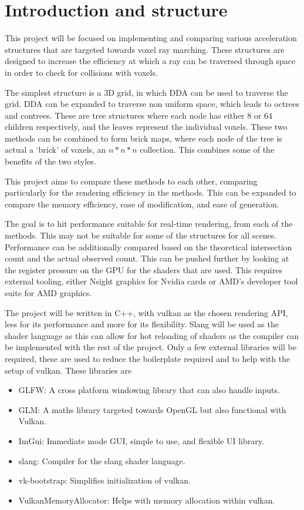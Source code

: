 \section*{Introduction and structure}

This project will be focused on implementing and comparing various
acceleration structures that are targeted towards voxel ray marching.
These structures are designed to increase the efficiency at which a
ray can be traversed through space in order to check for collisions with
voxels.

The simplest structure is a 3D grid, in which DDA can be used to
traverse the grid. DDA can be expanded to traverse non uniform space,
which leads to octrees and contrees. These are tree structures where
each node has either $8$ or $64$ children respectively, and the leaves
represent the individual voxels. These two methods can be combined to
form brick maps, where each node of the tree is actual a `brick' of voxels,
an $n*n*n$ collection. This combines some of the benefits of the two styles.

This project aims to compare these methods to each other, comparing
particularly for the rendering efficiency in the methods. This
can be expanded to compare the memory efficiency, ease of modification,
and ease of generation.

The goal is to hit performance suitable for real-time rendering, from each
of the methods. This may not be suitable for some of the structures
for all scenes.
Performance can be additionally compared based on the theoretical
intersection count and the actual observed count. This can be
pushed further by looking at the register pressure on the GPU for
the shaders that are used. This requires external tooling, either
Nsight graphics for Nvidia cards or AMD's developer tool suite for AMD graphics.

The project will be written in C++, with vulkan as the chosen rendering API,
less for its performance and more for its flexibility.
Slang will be used as the shader language as this can allow for hot reloading
of shaders as the compiler can be implemented with the rest of the project.
Only a few external libraries will be required, these are used to reduce the
boilerplate required and to help with the setup of vulkan. These libraries
are
\begin{itemize}
  \item GLFW: A cross platform windowing library that can also handle inputs.
  \item GLM: A maths library targeted towards OpenGL but also
    functional with Vulkan.
  \item ImGui: Immediate mode GUI, simple to use, and flexible UI library.
  \item slang: Compiler for the slang shader language.
  \item vk-bootstrap: Simplifies initialization of vulkan.
  \item VulkanMemoryAllocator: Helps with memory allocation within vulkan.
\end{itemize}

